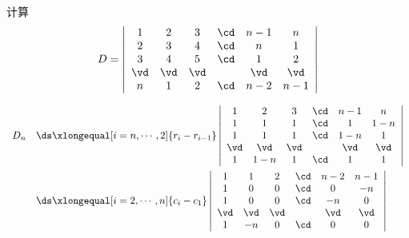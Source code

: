 \begin{frame}

\begin{testexample}
  计算
  $$
  D = \left |
    \begin{array}{cccccc}
      1 &  2 &  3 & \cd &  n-1 & n\\
      2 &  3 &  4 & \cd &   n  & 1\\
      3 &  4 &  5 & \cd &   1  & 2\\
      \vd& \vd& \vd&     & \vd  & \vd \\
      n &  1 &  2 & \cd & n-2  & n-1
    \end{array}
  \right|
  $$
\end{testexample}

\begin{jie}
$$
\begin{array}{ll}
  D_n &  \ds 
        \xlongequal[i=n,\cdots,2]{r_i-r_{i-1}} 
        \left|
        \begin{array}{cccccc}
          1   &  2 &  3 & \cd &  n-1 & n\\
          1   &  1 &  1 & \cd &   1  & 1-n \\
          1   &  1 &  1 & \cd &  1-n  & 1\\
          \vd & \vd & \vd&     & \vd  & \vd \\
          1   & 1-n &  1 & \cd &   1   & 1
        \end{array}
                                         \right| \\[1.0cm]
      & \ds 
        \xlongequal[i=2,\cdots,n]{c_i-c_1} 
        \left|
        \begin{array}{cccccc}
          1   &  1 &  2 & \cd &  n-2 & n-1\\
          1   &  0 &  0 & \cd &   0  & -n \\
          1   &  0 &  0 & \cd &  -n  & 0\\
          \vd & \vd & \vd&     & \vd  & \vd \\
          1   & -n &  0 & \cd &   0   & 0
        \end{array}
                                        \right|
\end{array}
$$








\end{jie}
\end{frame}
